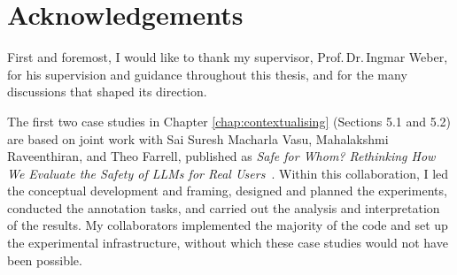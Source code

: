 \chapter*{Acknowledgements}


First and foremost, I would like to thank my supervisor, Prof.\,Dr.\,Ingmar Weber, for his supervision and guidance throughout this thesis, and for the many discussions that shaped its direction.

The first two case studies in Chapter \ref{chap:contextualising} (Sections 5.1 and 5.2) are based on joint work with Sai Suresh Macharla Vasu, Mahalakshmi Raveenthiran, and Theo Farrell, published as \textit{Safe for Whom? Rethinking How We Evaluate the Safety of LLMs for Real Users}~\cite{kempermann2026safewhomrethinkingevaluate}. Within this collaboration, I led the conceptual development and framing, designed and planned the experiments, conducted the annotation tasks, and carried out the analysis and interpretation of the results. My collaborators implemented the majority of the code and set up the experimental infrastructure, without which these case studies would not have been possible.

